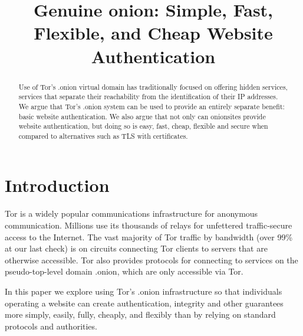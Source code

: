 \documentclass[10pt, conference, compsocconf]{styles/IEEEtran}
\title{Genuine onion: Simple, Fast, Flexible, and Cheap Website Authentication}
\author{
\IEEEauthorblockN{Paul Syverson}
\IEEEauthorblockA{U.S. Naval Research Laboratory\\
paul.syverson@nrl.navy.mil}
\and
\IEEEauthorblockN{Griffin Boyce}
\IEEEauthorblockA{Open Internet Tools Project\\
griffin@cryptolab.net}
}
\begin{document}
\maketitle

\begin{abstract}
  Use of Tor's .onion virtual domain has traditionally focused on
  offering hidden services, services that separate their reachability
  from the identification of their IP addresses. We argue that Tor's
  .onion system can be used to provide an entirely separate benefit:
  basic website authentication. We also argue that not only can
  onionsites provide website authentication, but doing so is easy,
  fast, cheap, flexible and secure when compared to alternatives such
  as TLS with certificates.
\end{abstract}

% 
% 
% 
% 
% 
% 
% 
% 
% 
% 
% 

\section{Introduction}
Tor is a widely popular communications infrastructure for anonymous
communication. Millions use its thousands of relays for unfettered
traffic-secure access to the Internet. The vast majority of Tor
traffic by bandwidth (over 99\% at our last check) is on circuits
connecting Tor clients to servers that are otherwise accessible.  Tor
also provides protocols for connecting to services on the
pseudo-top-level domain .onion, which are only accessible via Tor.

In this paper we explore using Tor's .onion infrastructure so that
individuals operating a website can create authentication, integrity
and other guarantees more simply, easily, fully, cheaply, and flexibly
than by relying on standard protocols and authorities.
\end{document}

